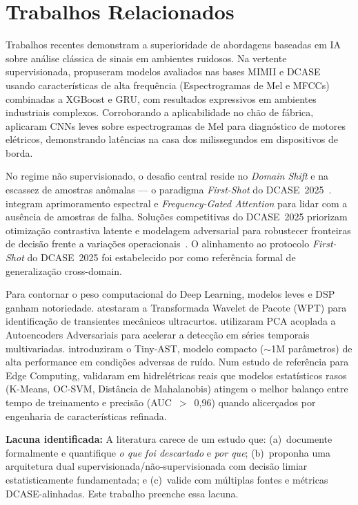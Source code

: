 \section{Trabalhos Relacionados}

\color{black}

Trabalhos recentes demonstram a superioridade de abordagens baseadas em IA sobre análise clássica de
sinais em ambientes ruidosos. Na vertente supervisionada, \cite{Le2025} propuseram modelos avaliados nas
bases MIMII e DCASE usando características de alta frequência (Espectrogramas de Mel e MFCCs) combinadas
a XGBoost e GRU, com resultados expressivos em ambientes industriais complexos. Corroborando a
aplicabilidade no chão de fábrica, \cite{Uzel2026} aplicaram CNNs leves sobre espectrogramas de Mel para
diagnóstico de motores elétricos, demonstrando latências na casa dos milissegundos em dispositivos de
borda.

No regime não supervisionado, o desafio central reside no \textit{Domain Shift} e na escassez de amostras
anômalas --- o paradigma \textit{First-Shot} do DCASE~2025~\cite{Nishida2025}. \cite{Bi2026} integram
aprimoramento espectral e \textit{Frequency-Gated Attention} para lidar com a ausência de amostras de
falha. Soluções competitivas do DCASE~2025 priorizam otimização contrastiva latente e modelagem
adversarial para robustecer fronteiras de decisão frente a variações operacionais~\cite{Jiang2025,
Emon2025}. O alinhamento ao protocolo \textit{First-Shot} do DCASE~2025 foi estabelecido por
\cite{Harada2023} como referência formal de generalização cross-domain.

Para contornar o peso computacional do Deep Learning, modelos leves e DSP ganham notoriedade.
\cite{Zamorano2025} atestaram a Transformada Wavelet de Pacote (WPT) para identificação de transientes
mecânicos ultracurtos. \cite{Ali2025} utilizaram PCA acoplada a Autoencoders Adversariais para acelerar
a detecção em séries temporais multivariadas. \cite{Zhang2026} introduziram o Tiny-AST, modelo compacto
($\sim$1M parâmetros) de alta performance em condições adversas de ruído. Num estudo de referência para
Edge Computing, \cite{Khamaisi2025} validaram em hidrelétricas reais que modelos estatísticos rasos
(K-Means, OC-SVM, Distância de Mahalanobis) atingem o melhor balanço entre tempo de treinamento e
precisão (AUC~$>$~0,96) quando alicerçados por engenharia de características refinada.

\textbf{Lacuna identificada:} A literatura carece de um estudo que: (a)~documente formalmente e
quantifique \textit{o que foi descartado} e \textit{por que}; (b)~proponha uma arquitetura dual
supervisionada/não-supervisionada com decisão limiar estatisticamente fundamentada; e
(c)~valide com múltiplas fontes e métricas DCASE-alinhadas. Este trabalho preenche essa lacuna.

\color{black}
